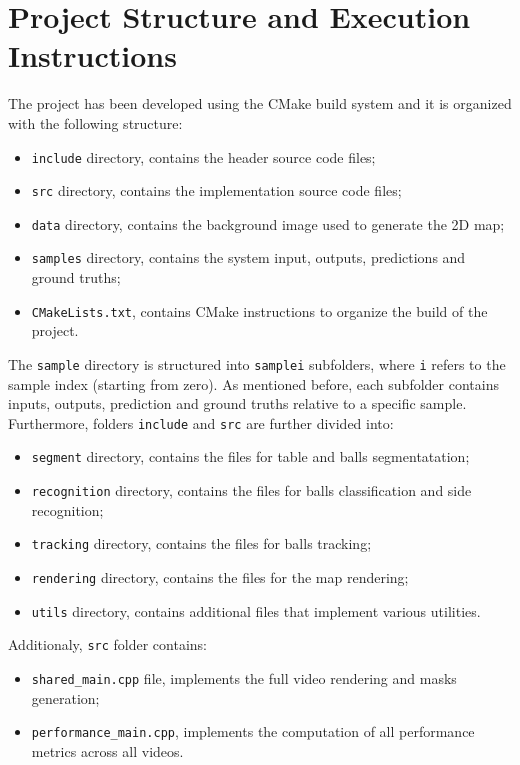 \section{Project Structure and Execution Instructions}


The project has been developed using the CMake build system and it is organized with the
following structure:
\begin{itemize}
    \item \verb|include| directory, contains the header source code files;
    \item \verb|src| directory, contains the implementation source code files;
    \item \verb|data| directory, contains the background image used to generate the 2D map;
    \item \verb|samples| directory, contains the system input, outputs, predictions and ground truths;
    \item \verb|CMakeLists.txt|, contains CMake instructions to organize the build of the project. 
\end{itemize}

\noindent
The \verb|sample| directory is structured into \verb|samplei| subfolders, where \verb|i| refers to the sample index (starting from zero).
As mentioned before, each subfolder contains inputs, outputs, prediction and ground truths relative to a specific sample.
\\
\noindent
Furthermore, folders \verb|include| and \verb|src| are further divided into:
\begin{itemize}
    \item \verb|segment| directory, contains the files for table and balls segmentatation;
    \item \verb|recognition| directory, contains the files for balls classification and side recognition;
    \item \verb|tracking| directory, contains the files for balls tracking;
    \item \verb|rendering| directory, contains the files for the map rendering;
    \item \verb|utils| directory, contains additional files that implement various utilities.
\end{itemize}

\noindent
Additionaly, \verb|src| folder contains:
\begin{itemize}
    \item \verb|shared_main.cpp| file, implements the full video rendering and masks generation;
    \item \verb|performance_main.cpp|, implements the computation of all performance metrics across all videos.
\end{itemize}

